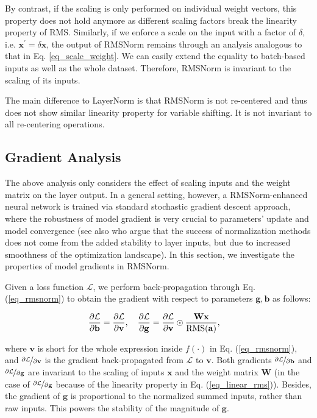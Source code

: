 By contrast, if the scaling is only performed on individual weight vectors, this property does not hold anymore as different scaling factors break the linearity property of RMS. Similarly, if we enforce a scale on the input with a factor of $\delta$, i.e. $\mathbf{x}^\prime = \delta \mathbf{x}$, the output of RMSNorm remains through an analysis analogous to that in Eq. \ref{eq_scale_weight}. We can easily extend the equality to batch-based inputs as well as the whole dataset. Therefore, RMSNorm is invariant to the scaling of its inputs.

The main difference to LayerNorm is that RMSNorm is not re-centered and thus does not show similar linearity property for variable shifting. It is not invariant to all re-centering operations.

\subsection{Gradient Analysis}

The above analysis only considers the effect of scaling inputs and the weight matrix on the layer output. In a general setting, however, a RMSNorm-enhanced neural network is trained via standard stochastic gradient descent approach, where the robustness of model gradient is very crucial to parameters' update and model convergence (see also \citet{santurkar2018does} who argue that the success of normalization methods does not come from the added stability to layer inputs, but due to increased smoothness of the optimization landscape). In this section, we investigate the properties of model gradients in RMSNorm.

Given a loss function $\mathcal{L}$, we perform back-propagation through Eq. (\ref{eq_rmsnorm}) to obtain the gradient with respect to parameters $\mathbf{g}, \mathbf{b}$ as follows:

\begin{align}
    \small
    & \frac{\partial \mathcal{L}}{\partial \mathbf{b}} = \frac{\partial \mathcal{L}}{\partial \mathbf{v}},  \quad \frac{\partial \mathcal{L}}{\partial \mathbf{g}} = \frac{\partial \mathcal{L}}{\partial \mathbf{v}} \odot \frac{\mathbf{Wx}}{\text{RMS}(\mathbf{a})},
\end{align}

where $\mathbf{v}$ is short for the whole expression inside $f(\cdot)$ in Eq. (\ref{eq_rmsnorm}), and $\nicefrac{\partial \mathcal{L}}{\partial \mathbf{v}}$ is the gradient back-propagated from $\mathcal{L}$ to $\mathbf{v}$. Both gradients $\nicefrac{\partial \mathcal{L}}{\partial \mathbf{b}}$ and $\nicefrac{\partial \mathcal{L}}{\partial \mathbf{g}}$ are invariant to the scaling of inputs $\mathbf{x}$ and the weight matrix $\mathbf{W}$ (in the case of $\nicefrac{\partial \mathcal{L}}{\partial \mathbf{g}}$ because of the linearity property in Eq. (\ref{eq_linear_rms})). Besides, the gradient of $\mathbf{g}$ is proportional to the normalized summed inputs, rather than raw inputs. This powers the stability of the magnitude of $\mathbf{g}$.

